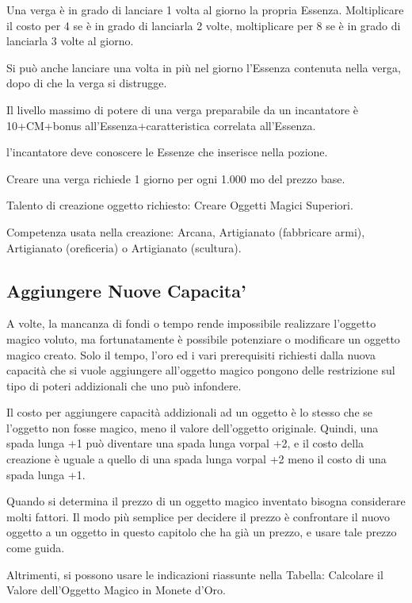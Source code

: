 \documentclass[a4paper,11pt,twoside,openany]{book}
\begin{document}
\bigskip

Una verga è in grado di lanciare 1 volta al giorno la propria Essenza. Moltiplicare il costo per 4 se è in grado di lanciarla 2 volte, moltiplicare per 8 se è in grado di lanciarla 3 volte al giorno.

Si può anche lanciare una volta in più nel giorno l'Essenza contenuta nella verga, dopo di che la verga si distrugge.

Il livello massimo di potere di una verga preparabile da un incantatore è 10+CM+bonus all'Essenza+caratteristica correlata all'Essenza.

l'incantatore deve conoscere le Essenze che inserisce nella pozione.

Creare una verga richiede 1 giorno per ogni 1.000 mo del prezzo base.

Talento di creazione oggetto richiesto: Creare Oggetti Magici Superiori.

Competenza usata nella creazione: Arcana, Artigianato (fabbricare armi), Artigianato (oreficeria) o Artigianato (scultura).

\subsection{Aggiungere Nuove Capacita'}

A volte, la mancanza di fondi o tempo rende impossibile realizzare l'oggetto magico voluto, ma fortunatamente è possibile potenziare o modificare un oggetto magico creato. Solo il tempo, l'oro ed i vari prerequisiti richiesti dalla nuova capacità che si vuole aggiungere all'oggetto magico pongono delle restrizione sul tipo di poteri addizionali che uno può infondere.

Il costo per aggiungere capacità addizionali ad un oggetto è lo stesso che se l'oggetto non fosse magico, meno il valore dell'oggetto originale. Quindi, una spada lunga +1 può diventare una spada lunga vorpal +2, e il costo della creazione è uguale a quello di una spada lunga vorpal +2 meno il costo di una spada lunga +1.

Quando si determina il prezzo di un oggetto magico inventato bisogna considerare molti fattori. Il modo più semplice per decidere il prezzo è confrontare il nuovo oggetto a un oggetto in questo capitolo che ha già un prezzo, e usare tale prezzo come guida.

Altrimenti, si possono usare le indicazioni riassunte nella Tabella: Calcolare il Valore dell'Oggetto Magico in Monete d'Oro.
\end{document}
